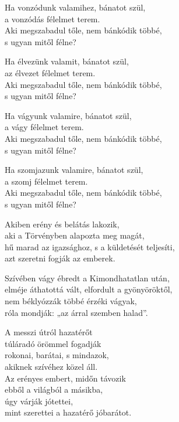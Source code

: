 \begin{dhpverse}

 Ha vonzódunk valamihez, bánatot szül,\\
a vonzódás félelmet terem.\\
Aki megszabadul tőle, nem bánkódik többé,\\
s ugyan mitől félne?

 Ha élvezünk valamit, bánatot szül,\\
az élvezet félelmet terem.\\
Aki megszabadul tőle, nem bánkódik többé,\\
s ugyan mitől félne?

 Ha vágyunk valamire, bánatot szül,\\
a vágy félelmet terem.\\
Aki megszabadul tőle, nem bánkódik többé,\\
s ugyan mitől félne?

 Ha szomjazunk valamire, bánatot szül,\\
a szomj félelmet terem.\\
Aki megszabadul tőle, nem bánkódik többé,\\
s ugyan mitől félne?

 Akiben erény és belátás lakozik,\\
aki a Törvényben alapozta meg magát,\\
hű marad az igazsághoz, s a küldetését teljesíti,\\
azt szeretni fogják az emberek.

 Szívében vágy ébredt a Kimondhatatlan után,\\
elméje áthatottá vált, elfordult a gyönyöröktől,\\
nem béklyózzák többé érzéki vágyak,\\
róla mondják: „az árral szemben halad”.

\end{dhpverse}
\newpage
\begin{dhpverse}

 A messzi útról hazatérőt\\
túláradó örömmel fogadják\\
rokonai, barátai, s mindazok,\\
akiknek szívéhez közel áll.\\
Az erényes embert, midőn távozik\\
ebből a világból a másikba,\\
úgy várják jótettei,\\
mint szerettei a hazatérő jóbarátot.

\end{dhpverse}
